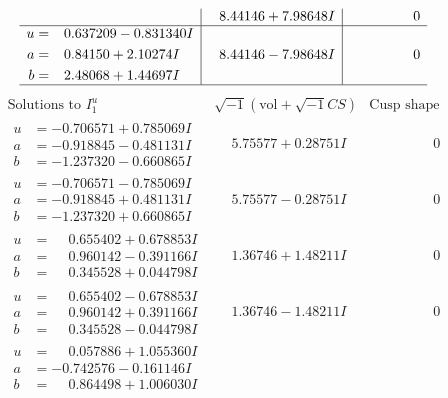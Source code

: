 \documentclass[1p]{elsarticle_modified}
\theoremstyle{definition}
\newcommand{\I}{\sqrt{-1}}
\begin{document}
$$\begin{array}{c|c|c}
 & \phantom{-}8.44146 + 7.98648 I & \phantom{-0.000000 } 0 \\ \hline\begin{aligned}
u &= \phantom{-}0.637209 - 0.831340 I \\
a &= \phantom{-}0.84150 + 2.10274 I \\
b &= \phantom{-}2.48068 + 1.44697 I\end{aligned}
 & \phantom{-}8.44146 - 7.98648 I & \phantom{-0.000000 } 0\\
 \hline 
 \end{array}$$\newpage$$\begin{array}{c|c|c}  
\text{Solutions to }I^u_{1}& \I (\text{vol} + \sqrt{-1}CS) & \text{Cusp shape}\\
 \hline 
\begin{aligned}
u &= -0.706571 + 0.785069 I \\
a &= -0.918845 - 0.481131 I \\
b &= -1.237320 - 0.660865 I\end{aligned}
 & \phantom{-}5.75577 + 0.28751 I & \phantom{-0.000000 } 0 \\ \hline\begin{aligned}
u &= -0.706571 - 0.785069 I \\
a &= -0.918845 + 0.481131 I \\
b &= -1.237320 + 0.660865 I\end{aligned}
 & \phantom{-}5.75577 - 0.28751 I & \phantom{-0.000000 } 0 \\ \hline\begin{aligned}
u &= \phantom{-}0.655402 + 0.678853 I \\
a &= \phantom{-}0.960142 - 0.391166 I \\
b &= \phantom{-}0.345528 + 0.044798 I\end{aligned}
 & \phantom{-}1.36746 + 1.48211 I & \phantom{-0.000000 } 0 \\ \hline\begin{aligned}
u &= \phantom{-}0.655402 - 0.678853 I \\
a &= \phantom{-}0.960142 + 0.391166 I \\
b &= \phantom{-}0.345528 - 0.044798 I\end{aligned}
 & \phantom{-}1.36746 - 1.48211 I & \phantom{-0.000000 } 0 \\ \hline\begin{aligned}
u &= \phantom{-}0.057886 + 1.055360 I \\
a &= -0.742576 - 0.161146 I \\
b &= \phantom{-}0.864498 + 1.006030 I\end{aligned}

\end{array}$$
\end{document}
